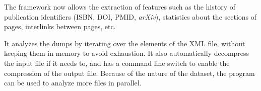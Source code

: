 The framework now allows the extraction of features such as the history of publication identifiers (\ac{ISBN}, \ac{DOI}, \ac{PMID}, \emph{arXiv}), statistics about the sections of pages, interlinks between pages, etc.

It analyzes the dumps by iterating over the elements of the XML file, without keeping them in memory to avoid exhaustion.
It also automatically decompress the input file if it needs to, and has a command line switch to enable the compression of the output file.
Because of the nature of the dataset, the program can be used to analyze more files in parallel.
